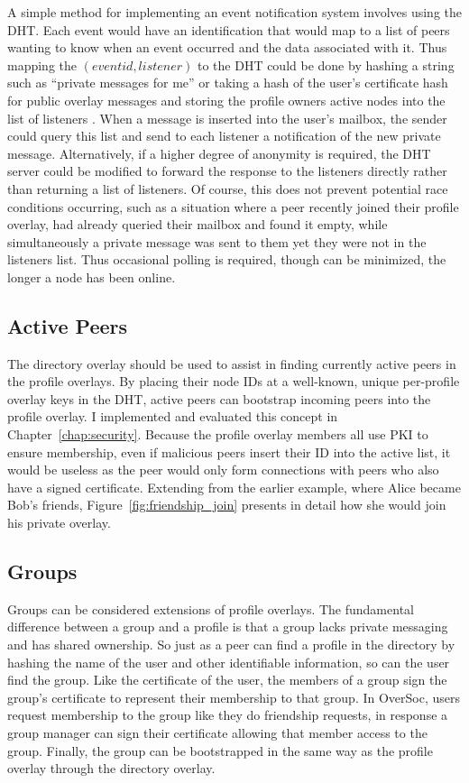 A simple method for implementing an event notification system involves using
the DHT.  Each event would have an identification that would map to a list of
peers wanting to know when an event occurred and the data associated with it.
Thus mapping the $(event id, listener)$ to the DHT could be done by hashing a
string such as ``private messages for me'' or taking a hash of the user's
certificate hash for public overlay messages and storing the profile owners
active nodes into the list of listeners .  When a message is inserted into the
user's mailbox, the sender could query this list and send to each listener a
notification of the new private message.  Alternatively, if a higher degree of
anonymity is required, the DHT server could be modified to forward the response
to the listeners directly rather than returning a list of listeners.  Of
course, this does not prevent potential race conditions occurring, such as a
situation where a peer recently joined their profile overlay, had already
queried their mailbox and found it empty, while simultaneously a private
message was sent to them yet they were not in the listeners list.  Thus
occasional polling is required, though can be minimized, the longer a node has
been online.

\subsection{Active Peers}

The directory overlay should be used to assist in finding currently active
peers in the profile overlays.  By placing their node IDs at a well-known,
unique per-profile overlay keys in the DHT, active peers can bootstrap incoming
peers into the profile overlay.  I implemented and evaluated this concept in
Chapter~\ref{chap:security}.  Because the profile overlay members all use PKI
to ensure membership, even if malicious peers insert their ID into the active
list, it would be useless as the peer would only form connections with peers
who also have a signed certificate.  Extending from the earlier example, where
Alice became Bob's friends, Figure~\ref{fig:friendship_join} presents in detail
how she would join his private overlay.

\subsection{Groups}

Groups can be considered extensions of profile overlays.  The fundamental
difference between a group and a profile is that a group lacks private
messaging and has shared ownership.  So just as a peer can find a profile in
the directory by hashing the name of the user and other identifiable
information, so can the user find the group.  Like the certificate of the user,
the members of a group sign the group's certificate to represent their
membership to that group.  In OverSoc, users request membership to the group
like they do friendship requests, in response a group manager can sign their
certificate allowing that member access to the group.  Finally, the group can
be bootstrapped in the same way as the profile overlay through the directory
overlay.

